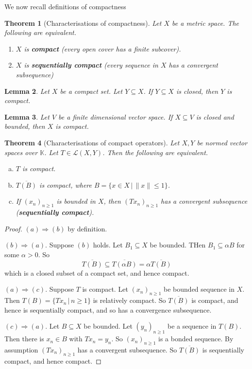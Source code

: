 \documentclass[10pt, reqno, oneside]{amsart}
\theoremstyle{plain}%
\newtheorem{thm}{Theorem}[section]
\newtheorem{lem}[thm]{Lemma}
\theoremstyle{definition}
\theoremstyle{remark}
\newcommand{\given}{ \, | \,}
\newcommand{\K}{\mathbb{K}}
\begin{document}
We now recall definitions of compactness
\begin{thm}[Characterisations of compactness]
	Let $X$ be a metric space. The following are equivalent.  
	\begin{enumerate}[(1)]
		\item $X$ is \textbf{compact} (every open cover has a finite subcover).
		\item $X$ is \textbf{sequentially compact} (every sequence in $X$ has a convergent subsequence)
	\end{enumerate}
\end{thm}

\begin{lem}
	Let $X$ be a compact set.  Let $Y \subseteq X$. If $Y \subseteq X$ is closed, then $Y$ is compact.
\end{lem}

\begin{lem}
	Let $V$ be a finite dimensional vector space.  If $X \subseteq V$ is closed and bounded, then $X$ is compact.
\end{lem}

\begin{thm}[Characterisations of compact operators]
	\label{thm:charcompact}
	Let $X, Y$ be normed vector spaces over $\K$.  Let $T \in \mathcal L(X,Y)$.  Then the following are equivalent.
	\begin{enumerate}[(a)]
		\item $T$ is compact.
		\item $\overline{T(B)}$ is compact, where $B = \{ x \in X \given \| x \| \leq 1 \}$.  
		\item If $(x_n)_{n \geq 1}$ is bounded in $X$, then $(Tx_n)_{n \geq 1}$ has a convergent subsequence (\textbf{sequentially compact}).
	\end{enumerate}
\end{thm}

\begin{proof}
	$(a) \Rightarrow (b)$ by definition.
	
	$(b) \Rightarrow (a)$.  Suppose $(b)$ holds.  Let $B_1 \subseteq X$ be bounded.  THen $B_1 \subseteq \alpha B$ for some $\alpha > 0$.  So \[
		\overline{T(B)} \subseteq \overline{T(\alpha B)} = \alpha \overline{T(B)}
	\] which is a closed subset of a compact set, and hence compact.  
	
	$(a) \Rightarrow (c)$.  Suppose $T$ is compact.  Let $(x_n)_{n \geq 1}$ be bounded sequence in $X$.  Then $T(B) = \{ Tx_n \given n \geq 1 \}$ is relatively compact.  So $\overline{T(B)}$ is compact, and hence is sequentially compact, and so has a convergence subsequence.
	
	$(c) \Rightarrow (a)$.  Let $B \subseteq X$ be bounded.  Let $(y_n)_{n \geq 1}$ be a sequence in $T(B)$.  Then there is $x_n \in B$ with $Tx_n = y_n$.  So $(x_n)_{n \geq 1}$ is a bonded sequence.  By assumption $(Tx_n)_{n \geq 1}$ has a convergent subsequence.  So $\overline{T(B)}$ is sequentially compact, and hence compact.
\end{proof}
\end{document}
